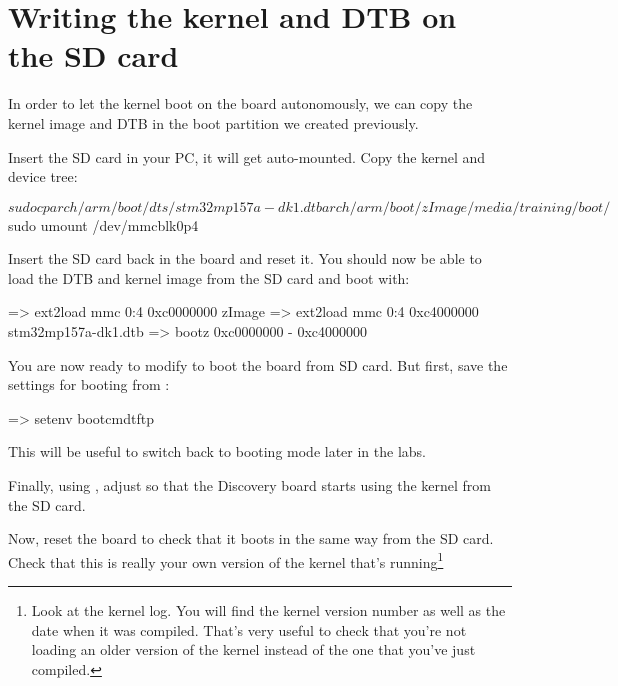 \section{Writing the kernel and DTB on the SD card}

In order to let the kernel boot on the board autonomously, we can
copy the kernel image and DTB in the boot partition we created
previously.

Insert the SD card in your PC, it will get auto-mounted. Copy the
kernel and device tree:

\begin{bashinput}
$ sudo cp arch/arm/boot/dts/stm32mp157a-dk1.dtb arch/arm/boot/zImage /media/training/boot/
$ sudo umount /dev/mmcblk0p4
\end{bashinput}
\normalsize

Insert the SD card back in the board and reset it. You should now be
able to load the DTB and kernel image from the SD card and boot with:

\begin{ubootinput}
=> ext2load mmc 0:4 0xc0000000 zImage
=> ext2load mmc 0:4 0xc4000000 stm32mp157a-dk1.dtb
=> bootz 0xc0000000 - 0xc4000000
\end{ubootinput}

You are now ready to modify  to boot the board
from SD card. But first, save the settings for booting from
:

\begin{ubootinput}
=> setenv bootcmdtftp %
\end{ubootinput}

This will be useful to switch back to  booting mode
later in the labs.

Finally, using , adjust  so that
the Discovery board starts using the kernel from the SD card.

Now, reset the board to check that it boots in the same way from the
SD card. Check that this is really your own version of the kernel
that's running\footnote{Look at the kernel log. You will find the
kernel version number as well as the date when it was compiled.
That's very useful to check that you're not loading an older version
of the kernel instead of the one that you've just compiled.}


